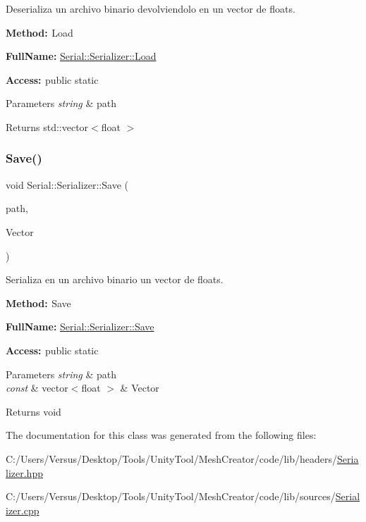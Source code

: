 Deserializa un archivo binario devolviendolo en un vector de floats. 

{\bfseries{Method\+: }} Load

{\bfseries{Full\+Name\+:}} \mbox{\hyperlink{class_serial_1_1_serializer_a56a80936b40aeb442b00c35aee514dac}{Serial\+::\+Serializer\+::\+Load}}

{\bfseries{Access\+: }} public static 
\begin{DoxyParams}{Parameters}
{\em string} & path \\
\hline
\end{DoxyParams}
\begin{DoxyReturn}{Returns}
std\+::vector$<$float $>$ 
\end{DoxyReturn}
\mbox{\label{class_serial_1_1_serializer_aba1c0b41e834ad9990ee0387e126dbf7}} 
\subsubsection{\texorpdfstring{Save()}{Save()}}
{\footnotesize\ttfamily void Serial\+::\+Serializer\+::\+Save (\begin{DoxyParamCaption}\item[{string}]{path,  }\item[{const vector$<$ float $>$ \&}]{Vector }\end{DoxyParamCaption})\hspace{0.3cm}{\ttfamily [static]}}



Serializa en un archivo binario un vector de floats. 

{\bfseries{Method\+: }} Save

{\bfseries{Full\+Name\+:}} \mbox{\hyperlink{class_serial_1_1_serializer_aba1c0b41e834ad9990ee0387e126dbf7}{Serial\+::\+Serializer\+::\+Save}}

{\bfseries{Access\+: }} public static 
\begin{DoxyParams}{Parameters}
{\em string} & path \\
\hline
{\em const} & vector$<$float $>$ \& Vector \\
\hline
\end{DoxyParams}
\begin{DoxyReturn}{Returns}
void 
\end{DoxyReturn}


The documentation for this class was generated from the following files\+:\begin{DoxyCompactItemize}
\item 
C\+:/\+Users/\+Versus/\+Desktop/\+Tools/\+Unity\+Tool/\+Mesh\+Creator/code/lib/headers/\mbox{\hyperlink{_serializer_8hpp}{Serializer.\+hpp}}\item 
C\+:/\+Users/\+Versus/\+Desktop/\+Tools/\+Unity\+Tool/\+Mesh\+Creator/code/lib/sources/\mbox{\hyperlink{_serializer_8cpp}{Serializer.\+cpp}}\end{DoxyCompactItemize}
